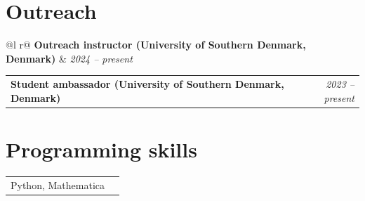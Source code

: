 \documentclass[a4paper, 11pt]{article}
\begin{document}
\section{Outreach}

\begin{tabularx}{\linewidth}{ @{}l r@{} }
\textbf{Outreach instructor \small\normalfont (University of Southern Denmark, Denmark)} & \hfill \textit{2024 -- present} \\ [3.75pt]
\end{tabularx}


\begin{tabularx}{\linewidth}{ @{}X r@{} }
\textbf{Student ambassador  \small\normalfont (University of Southern Denmark, Denmark)} & \hfill \textit{2023 -- present}
\end{tabularx}


\section{Programming skills}
\begin{tabularx}{\linewidth}{@{}l X@{}}
\normalsize{Python, Mathematica}
\end{tabularx}


\vfill
{}
\end{document}
